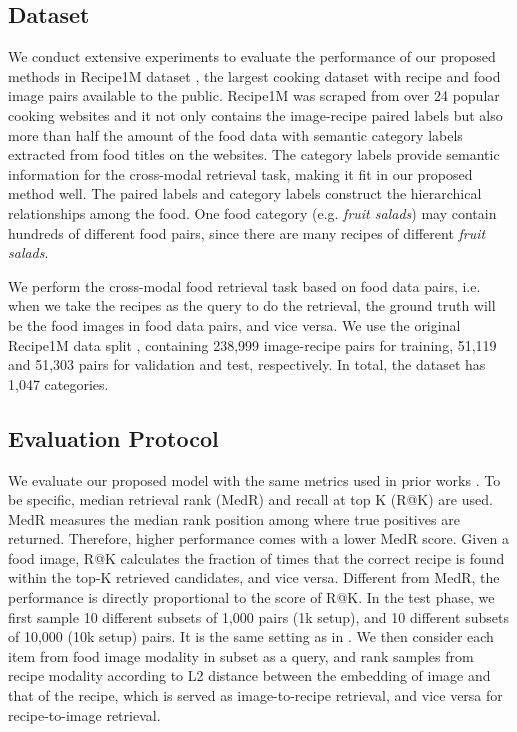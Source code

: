 \documentclass[journal]{IEEEtran}
\begin{document}
\subsection{Dataset}\label{Dataset}
We conduct extensive experiments to evaluate the performance of our proposed methods in Recipe1M dataset \cite{salvador2017learning}, the largest cooking dataset with recipe and food image pairs available to the public. Recipe1M was scraped from over 24 popular cooking websites and it not only contains the image-recipe paired labels but also more than half the amount of the food data with semantic category labels extracted from food titles on the websites. The category labels provide semantic information for the cross-modal retrieval task, making it fit in our proposed method well. The paired labels and category labels construct the hierarchical relationships among the food. One food category (e.g. \emph{fruit salads}) may contain hundreds of different food pairs, since there are many recipes of different \emph{fruit salads}.

We perform the cross-modal food retrieval task based on food data pairs, i.e. when we take the recipes as the query to do the retrieval, the ground truth will be the food images in food data pairs, and vice versa. We use the original Recipe1M data split \cite{salvador2017learning}, containing 238,999 image-recipe pairs for training, 51,119 and 51,303 pairs for validation and test, respectively. In total, the dataset has 1,047 categories.


\subsection{Evaluation Protocol}

We evaluate our proposed model with the same metrics used in prior works \cite{salvador2017learning,chen2018deep,carvalho2018cross,zhu2019r2gan,wang2019learning}. To be specific, median retrieval rank (MedR) and recall at top K (R@K) are used. MedR measures the median rank position among where true positives are returned. Therefore, higher performance comes with a lower MedR score. Given a food image, R@K calculates the fraction of times that the correct recipe is found within the top-K retrieved candidates, and vice versa. Different from MedR, the performance is directly proportional to the score of R@K. In the test phase, we first sample 10 different subsets of 1,000 pairs (1k setup), and 10 different subsets of 10,000 (10k setup) pairs. It is the same setting as in \cite{salvador2017learning}. We then consider each item from food image modality in subset as a query, and rank samples from recipe modality according to L2 distance between the embedding of image and that of the recipe, which is served as image-to-recipe retrieval, and vice versa for recipe-to-image retrieval.  
\end{document}
